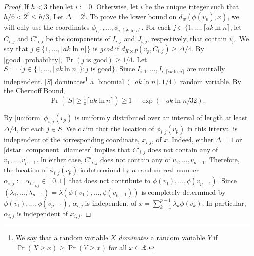 \documentclass{patmorin}
\renewcommand{\ge}{\geqslant}
\renewcommand{\le}{\leqslant}
\newcommand{\defin}[1]{\emph{\textcolor{brightmaroon}{#1}}}
\begin{document}
\begin{proof}
  If $h < 3$ then let $i:=0$.  Otherwise, let $i$ be the unique integer such that $h/6< 2^i \le h/3$, Let $\Delta=2^i$.  To prove the lower bound on $d_w(\phi(v_p),x)$, we will only use the coordinates $\phi_{i,1},\ldots,\phi_{i,\lceil a k\ln n\rceil}$.  For each $j\in\{1,\ldots,\lceil ak\ln n\rceil$, let $C_{i,j}$ and $C'_{i,j}$ be the components of $I_{i,j}$ and $J_{i,j}$, respectively, that contain $v_p$. We say that $j\in\{1,\ldots,\lceil a k\ln n\rceil\}$ is \defin{good} if $d_{H\boxtimes P}(v_p,\overline{C}_{i,j})\ge \Delta/4$.  By \cref{good_probability},  $\Pr(\text{$j$ is good})\ge 1/4$. Let $S:=\{j\in\{1,\ldots,\lceil a k\ln n\rceil\}:\text{$j$ is good}\}$.  Since $I_{i,1},\ldots,I_{i,\lceil a k\ln n\rceil}$ are mutually independent, $|S|$ dominates\footnote{We say that a random variable $X$ \defin{dominates} a random variable $Y$ if $\Pr(X\ge x)\ge\Pr(Y\ge x)$ for all $x\in\mathbb{R}$.} a $\operatorname{binomial}(\lceil a k\ln n\rceil,1/4)$ random variable. By the Chernoff Bound,
  $$\Pr(|S|\ge \tfrac{1}{8}\lceil a k\ln n\rceil)\ge 1-\exp(-ak\ln n/32).$$

  By \cref{uniform} $\phi_{i,j}(v_p)$ is uniformly distributed over an interval of length at least $\Delta/4$, for each $j\in S$.  We claim that the location of $\phi_{i,j}(v_p)$ in this interval is independent of the corresponding coordinate, $x_{i,j}$, of $x$.  Indeed, either $\Delta=1$ or \cref{dstar_component_diameter} implies that $C'_{i,j}$ does not contain any of $v_1,\ldots,v_{p-1}$. In either case, $C'_{i,j}$ does not contain any of $v_1,\ldots,v_{p-1}$.  Therefore, the location of $\phi_{i,j}(v_p)$ is determined by a random real number $\alpha_{i,j}:=\alpha_{C'_{i,j}}\in[0,1]$ that does not contribute to $\phi(v_1),\ldots,\phi(v_{p-1})$.  Since $(\lambda_1,\ldots,\lambda_{p-1})=\lambda(\phi(v_1),\ldots,\phi(v_{p-1}))$ is completely determined by $\phi(v_1),\ldots,\phi(v_{p-1})$, $\alpha_{i,j}$ is independent of $x=\sum_{k=1}^{p-1}\lambda_k\phi(v_k)$.  In particular, $\alpha_{i,j}$ is independent of $x_{i,j}$.


\end{proof}
\end{document}
